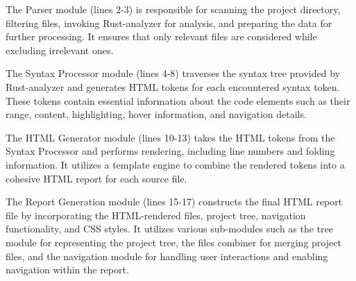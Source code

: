 The Parser module (lines 2-3) is responsible for scanning the project directory, filtering files, invoking Rust-analyzer for analysis, and preparing the data for further processing. It ensures that only relevant files are considered while excluding irrelevant ones.

The Syntax Processor module (lines 4-8) traverses the syntax tree provided by Rust-analyzer and generates HTML tokens for each encountered syntax token. These tokens contain essential information about the code elements such as their range, content, highlighting, hover information, and navigation details.

The HTML Generator module (lines 10-13) takes the HTML tokens from the Syntax Processor and performs rendering, including line numbers and folding information. It utilizes a template engine to combine the rendered tokens into a cohesive HTML report for each source file.

The Report Generation module (lines 15-17) constructs the final HTML report file by incorporating the HTML-rendered files, project tree, navigation functionality, and CSS styles. It utilizes various sub-modules such as the tree module for representing the project tree, the files combiner for merging project files, and the navigation module for handling user interactions and enabling navigation within the report.
